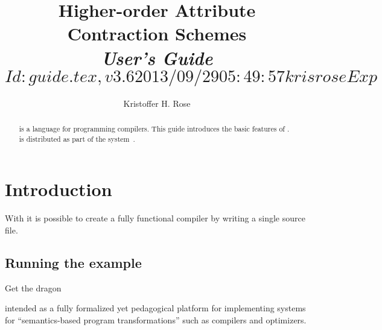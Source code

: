 \documentclass[11pt]{article} %
\title{Higher-order Attribute Contraction Schemes\\\emph{User's Guide}%
  \version$Id: guide.tex,v 3.6 2013/09/29 05:49:57 krisrose Exp $}
\author{Kristoffer H. Rose}
\begin{document}
\maketitle

\begin{abstract}\noindent
  \HAX is a language for programming compilers.  This guide introduces the basic features of \HAX.
  \HAX is distributed as part of the \CRSX system~\cite{crsx}.
\end{abstract}

\tableofcontents
\clearpage


\section{Introduction}

With \HAX it is possible to create a fully functional compiler by writing a single source file.

\subsection{Running the example}

Get the dragon


 intended as a fully formalized yet pedagogical platform
for implementing systems for ``semantics-based program transformations'' such as compilers and
optimizers.
\end{document}
